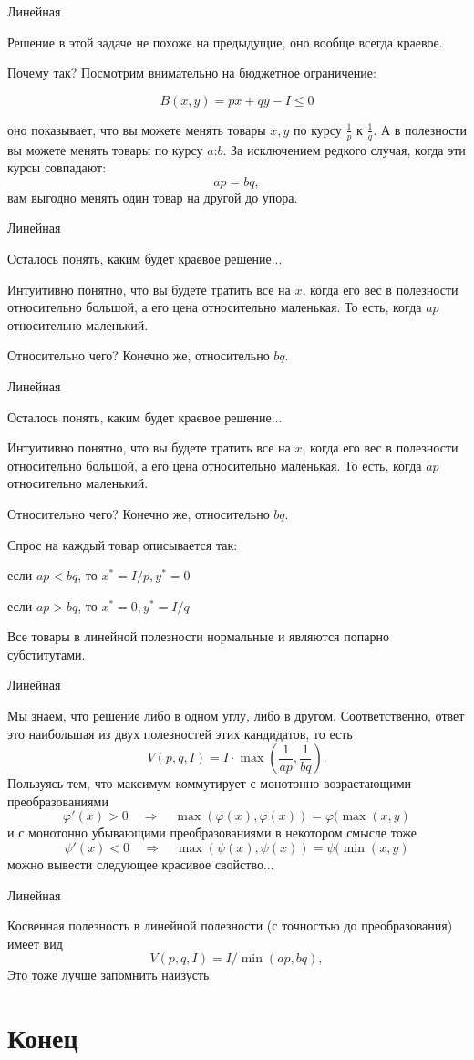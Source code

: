 \documentclass{beamer}
\begin{document}
\begin{frame}{Линейная}

Решение в этой задаче не похоже на предыдущие, оно вообще всегда краевое. 

Почему так? Посмотрим внимательно на бюджетное ограничение:

$$B(x,y) = px + qy - I \leqslant 0$$ 

оно показывает, что вы можете менять товары $x, y$ по курсу $\frac{1}{p}$ к $\frac{1}{q}$. А в полезности вы можете менять товары по курсу $a$:$b$. За исключением редкого случая, когда эти курсы совпадают: 
$$ap = bq,$$ 
вам выгодно менять один товар на другой до упора.
\end{frame}

\begin{frame}{Линейная}

Осталось понять, каким будет краевое решение...

Интуитивно понятно, что вы будете тратить все на $x$, когда его вес в полезности относительно большой, а его цена относительно маленькая. То есть, когда $ap$ относительно маленький. 

Относительно чего? Конечно же, относительно $bq$.

\end{frame}

\begin{frame}{Линейная}

Осталось понять, каким будет краевое решение...

Интуитивно понятно, что вы будете тратить все на $x$, когда его вес в полезности относительно большой, а его цена относительно маленькая. То есть, когда $ap$ относительно маленький. 

Относительно чего? Конечно же, относительно $bq$.

Спрос на каждый товар описывается так: 

если $ap < bq$, то $x^{\ast} = I/p, y^{\ast} = 0$

если $ap > bq$, то $x^{\ast} = 0, y^{\ast} = I/q$

Все товары в линейной полезности нормальные и являются попарно субститутами.

\end{frame}

\begin{frame}{Линейная}

Мы знаем, что решение либо в одном углу, либо в другом. Соответственно, ответ это наибольшая из двух полезностей этих кандидатов, то есть
$$V(p,q,I) = I \cdot \max(\frac{1}{ap}, \frac{1}{bq}).$$
Пользуясь тем, что максимум коммутирует с монотонно возрастающими преобразованиями
$$ \varphi'(x) >0 \quad \Rightarrow \quad \max(\varphi(x), \varphi(x)) = \varphi(\max(x, y)$$
и с монотонно убывающими преобразованиями в некотором смысле тоже
$$ \psi'(x) < 0 \quad \Rightarrow \quad \max(\psi(x), \psi(x)) = \psi(\min(x, y)$$
можно вывести следующее красивое свойство...

\end{frame}

\begin{frame}{Линейная}

Косвенная полезность в линейной полезности (с точностью до преобразования) имеет вид
$$V(p,q,I) = I / \min(ap, bq),$$
Это тоже лучше запомнить наизусть.
\end{frame}

\section{Конец}
\end{document}
